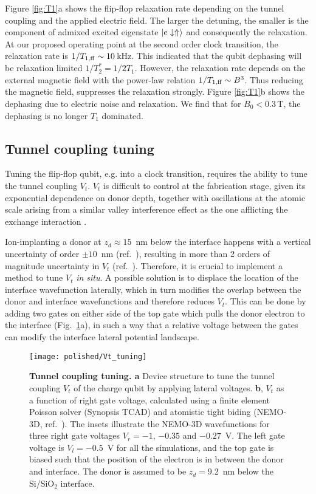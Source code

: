 Figure \ref{fig:T1}a shows the flip-flop relaxation rate depending on the tunnel coupling and the applied electric field. The larger the detuning, the smaller is the component of admixed excited eigenstate $\ket{e\downarrow\Uparrow}$ and consequently the relaxation. At our proposed operating point at the second order clock transition, the relaxation rate is ${1}/{T_{1,\rm ff}}\sim 10\, $kHz. This indicated that the qubit dephasing will be relaxation limited $1/T_2^*=1/2T_1$. However, the relaxation rate depends on the external magnetic field with the power-law relation $1/T_{1,\rm{ff}}\sim B^3$\cite{Boross2016}. Thus reducing the magnetic field, suppresses the relaxation strongly. Figure \ref{fig:T1}b shows the dephasing due to electric noise and relaxation. We find that for $B_0<0.3\,$T, the dephasing is no longer $T_1$ dominated. 


\subsection{Tunnel coupling tuning}

Tuning the flip-flop qubit, e.g. into a clock transition, requires the ability to tune the tunnel coupling $V_t$. $V_t$ is difficult to control at the fabrication stage, given its exponential dependence on donor depth, together with oscillations at the atomic scale \cite{Calderon2009} arising from a similar valley interference effect as the one afflicting the exchange interaction \cite{Koiller2002}. 

Ion-implanting a donor at $z_d \approx 15$~nm below the interface happens with a vertical uncertainty of order $\pm 10$~nm (ref.~\cite{VanDonkelaar2015}), resulting in more than 2 orders of magnitude uncertainty in $V_t$ (ref.~\cite{Calderon2009}). Therefore, it is crucial to implement a method to tune $V_t$ \emph{in situ}. A possible solution is to displace the location of the interface wavefunction laterally, which in turn modifies the overlap between the donor and interface wavefunctions and therefore reduces $V_t$. This can be done by adding two gates on either side of the top gate which pulls the donor electron to the interface (Fig.~\ref{fig:Vt_tuning}a), in such a way that a relative voltage between the gates can modify the interface lateral potential landscape. 

\begin{figure}[h]
	\centering
	\texttt{[image: polished/Vt\_tuning]}
	\caption[Tunnel coupling tuning]{\textbf{Tunnel coupling tuning. a} Device structure to tune the tunnel coupling $V_t$ of the charge qubit by applying lateral voltages. 
		\textbf{b}, $V_t$ as a function of right gate voltage, calculated using a finite element Poisson solver (Synopsis\textsuperscript{\textregistered} TCAD) and atomistic tight biding (NEMO-3D, ref.~\cite{Klimeck2007a, Klimeck2007b}). The insets illustrate the NEMO-3D wavefunctions for three right gate voltages $V_r=-1$, $-0.35$ and $-0.27$~V. The left gate voltage is $V_l=-0.5$~V for all the simulations, and the top gate is biased such that the position of the electron is in between the donor and interface. The donor is assumed to be $z_d=9.2$~nm below the Si/SiO$_2$ interface.}
	\label{fig:Vt_tuning}
\end{figure}

